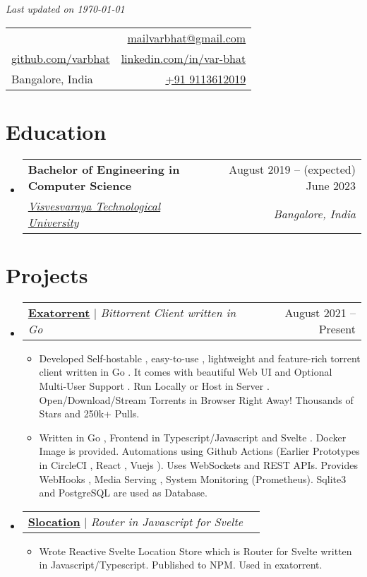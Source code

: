 \documentclass[letterpaper,11pt]{article}
\makeatletter
\newcommand{\ResumeHeader}[6]{
\hspace*{\fill} {\scriptsize\color{gray}\emph{Last updated on \today}}
\begin{tabular*}{\textwidth}{l@{\extracolsep{\fill}}r}
 #1 & #2 \\
 #3 & #4 \\
 #5 & #6 \\
\end{tabular*}
}
\newcommand{\EducationEntry}[4]{
  \vspace{-1pt}\item
    \begin{tabular*}{0.97\textwidth}[t]{l@{\extracolsep{\fill}}r}
      \textbf{#1} & #2 \\
      \textit{\small#3} & \textit{\small #4} \\
    \end{tabular*}\vspace{-5pt}
}
\newcommand{\resumeSubHeadingListStart}{\begin{itemize}[leftmargin=*]}
\newcommand{\resumeSubHeadingListEnd}{\end{itemize}}
\newcommand{\resumeProjectHeading}[2]{
    \item
    \begin{tabular*}{0.97\textwidth}{l@{\extracolsep{\fill}}r}
      \small#1 & #2 \\
    \end{tabular*}\vspace{-7pt}
}
\newcommand{\projectItemListStart}{\begin{itemize}[leftmargin=2mm]}
\newcommand{\projectItemListEnd}{\end{itemize}}
\newcommand{\projectItem}[1]{
  \item[$\diamond$]\small{
    {#1}
  }
}
\makeatother
\begin{document}
\ResumeHeader
{\textbf{\href{https://github.com/varbhat}{\Large\color{black}{Var Bhat}}}}   {\href{mailto:mailvarbhat@gmail.com}{mailvarbhat@gmail.com}}
{\href{https://github.com/varbhat}{github.com/varbhat}} {\href{https://linkedin.com/in/var-bhat}{linkedin.com/in/var-bhat}} 
{{Bangalore, India}}
{\href{tel:+919113612019}{+91 9113612019}}


\section{Education}
\resumeSubHeadingListStart
\EducationEntry
{Bachelor of Engineering in Computer Science}
{August 2019 -- (expected) June 2023}
{\href{https://vtu.ac.in}{Visvesvaraya Technological University}}
{Bangalore, India}
\resumeSubHeadingListEnd
\setlength{\columnsep}{0.5cm}


\setlength{\columnsep}{0.5cm}


\section{Projects}

\resumeSubHeadingListStart
\resumeProjectHeading
{\textbf{\href{https://github.com/varbhat/exatorrent}{Exatorrent}} $|$ \emph{Bittorrent Client written in Go}}{August 2021 -- Present}
\projectItemListStart
\projectItem{Developed Self-hostable , easy-to-use , lightweight and feature-rich torrent client written in Go . It comes with beautiful Web UI and Optional Multi-User Support . Run Locally or Host in Server . Open/Download/Stream Torrents in Browser Right Away! Thousands of Stars and 250k+ Pulls.}
\projectItem{Written in Go , Frontend in Typescript/Javascript and Svelte . Docker Image is provided. Automations using Github Actions (Earlier Prototypes in CircleCI , React , Vuejs ). Uses WebSockets and REST APIs. Provides WebHooks , Media Serving , System Monitoring (Prometheus). Sqlite3 and PostgreSQL are used as Database.}
\projectItemListEnd
\resumeSubHeadingListEnd
    
\resumeSubHeadingListStart
\resumeProjectHeading
{\textbf{\href{https://github.com/varbhat/slocation}{Slocation}} $|$ \emph{Router in Javascript for Svelte}}{}
\projectItemListStart
\projectItem{Wrote Reactive Svelte Location Store which is Router for Svelte written in Javascript/Typescript. Published to NPM. Used in exatorrent.}
\projectItemListEnd
\resumeSubHeadingListEnd
    
\end{document}
